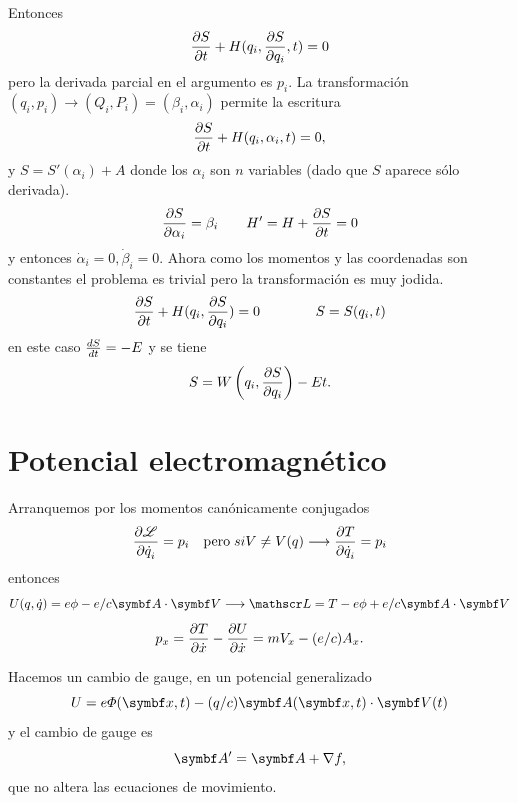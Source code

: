 \documentclass[10pt,oneside]{CBFT_book}
\begin{document}
Entonces
\[
	\dpar{S}{t} + H(q_i,\dpar{S}{q_i},t) = 0
\]
pero la derivada parcial en el argumento es $p_i$. La transformación $(q_i,p_i) \to (Q_i,P_i) = (\beta_i,\alpha_i)$ 
permite la escritura
\[
	\dpar{S}{t} + H(q_i,\alpha_i,t) = 0,
\]
y $S = S'(\alpha_i) + A$ donde los $\alpha_i$ son $n$ variables (dado que $S$ aparece sólo derivada).
\[
	\dpar{S}{\alpha_i} = \beta_i \qquad H'= H + \dpar{S}{t} = 0
\]
y entonces $ \dot{\alpha}_i = 0, \dot{\beta}_i=0 $. Ahora como los momentos y las coordenadas son constantes el problema
es trivial pero la transformación es muy jodida.
\[
	\dpar{S}{t} + H(q_i,\dpar{S}{q_i}) = 0 \qquad \qquad S = S(q_i,t)
\]
en este caso $ \dtot{S}{t} = -E $ y se tiene 
\[
	S = W\left( q_i,\dpar{S}{q_i} \right) - E t.
\]



\section{Potencial electromagnético}

Arranquemos por los momentos canónicamente conjugados
\[
	\dpar{\Lag}{\dot{q}_i} = p_i \quad \textrm{pero} \; si V \neq V(q) \longrightarrow \dpar{T}{\dot{q}_i} = p_i
\]
entonces
\[
	U(q,\dot{q}) =  e \phi - e/c \vb{A}\cdot\vb{V} \longrightarrow \Lag = T - e \phi + e/c  \vb{A}\cdot\vb{V}
\]
\[
	p_x = \dpar{T}{\dot{x}} - \dpar{U}{\dot{x}} = m V_x - (e/c) A_x.
\]

Hacemos un cambio de gauge, en un potencial generalizado
\[
	U =  e \Phi(\vb{x},t) - (q/c) \vb{A}(\vb{x},t)\cdot\vb{V}(t)
\]
y el cambio de gauge es
\[
	\vb{A}' = \vb{A} + \nabla f,
\]
que no altera las ecuaciones de movimiento.
\end{document}
